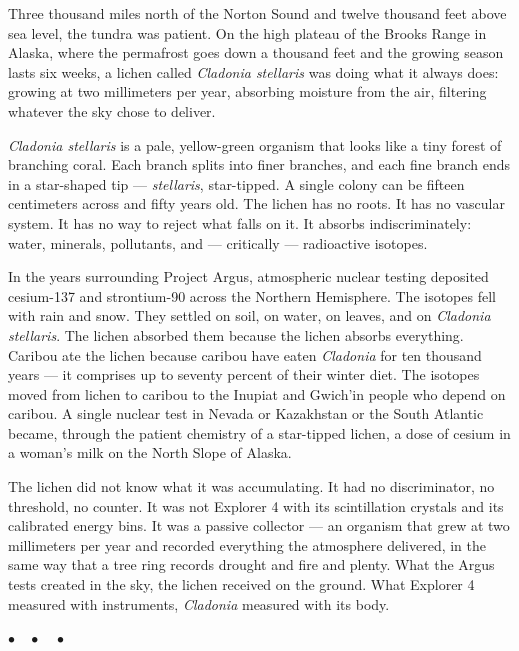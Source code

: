 \documentclass[12pt, letterpaper]{article}
\begin{document}
Three thousand miles north of the Norton Sound and twelve thousand feet above sea level, the tundra was patient. On the high plateau of the Brooks Range in Alaska, where the permafrost goes down a thousand feet and the growing season lasts six weeks, a lichen called \textit{Cladonia stellaris} was doing what it always does: growing at two millimeters per year, absorbing moisture from the air, filtering whatever the sky chose to deliver.

\textit{Cladonia stellaris} is a pale, yellow-green organism that looks like a tiny forest of branching coral. Each branch splits into finer branches, and each fine branch ends in a star-shaped tip --- \textit{stellaris}, star-tipped. A single colony can be fifteen centimeters across and fifty years old. The lichen has no roots. It has no vascular system. It has no way to reject what falls on it. It absorbs indiscriminately: water, minerals, pollutants, and --- critically --- radioactive isotopes.

In the years surrounding Project Argus, atmospheric nuclear testing deposited cesium-137 and strontium-90 across the Northern Hemisphere. The isotopes fell with rain and snow. They settled on soil, on water, on leaves, and on \textit{Cladonia stellaris}. The lichen absorbed them because the lichen absorbs everything. Caribou ate the lichen because caribou have eaten \textit{Cladonia} for ten thousand years --- it comprises up to seventy percent of their winter diet. The isotopes moved from lichen to caribou to the Inupiat and Gwich'in people who depend on caribou. A single nuclear test in Nevada or Kazakhstan or the South Atlantic became, through the patient chemistry of a star-tipped lichen, a dose of cesium in a woman's milk on the North Slope of Alaska.

The lichen did not know what it was accumulating. It had no discriminator, no threshold, no counter. It was not Explorer 4 with its scintillation crystals and its calibrated energy bins. It was a passive collector --- an organism that grew at two millimeters per year and recorded everything the atmosphere delivered, in the same way that a tree ring records drought and fire and plenty. What the Argus tests created in the sky, the lichen received on the ground. What Explorer 4 measured with instruments, \textit{Cladonia} measured with its body.

\begin{center}
$\bullet\quad\bullet\quad\bullet$
\end{center}
\end{document}
